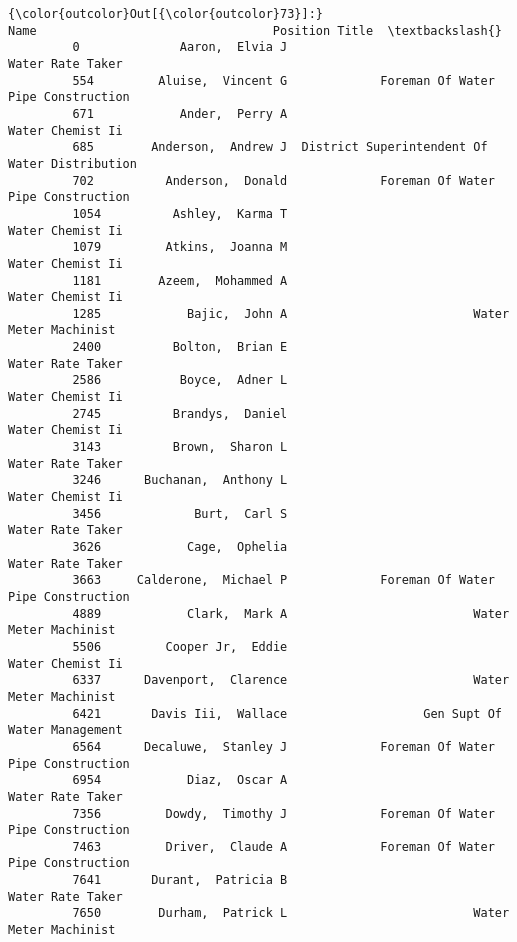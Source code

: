 \documentclass[11pt]{article}
\begin{document}
\begin{Verbatim}[commandchars=\\\{\}]
{\color{outcolor}Out[{\color{outcolor}73}]:}                           Name                                 Position Title  \textbackslash{}
         0              Aaron,  Elvia J                               Water Rate Taker   
         554         Aluise,  Vincent G             Foreman Of Water Pipe Construction   
         671            Ander,  Perry A                               Water Chemist Ii   
         685        Anderson,  Andrew J  District Superintendent Of Water Distribution   
         702          Anderson,  Donald             Foreman Of Water Pipe Construction   
         1054          Ashley,  Karma T                               Water Chemist Ii   
         1079         Atkins,  Joanna M                               Water Chemist Ii   
         1181        Azeem,  Mohammed A                               Water Chemist Ii   
         1285            Bajic,  John A                          Water Meter Machinist   
         2400          Bolton,  Brian E                               Water Rate Taker   
         2586           Boyce,  Adner L                               Water Chemist Ii   
         2745          Brandys,  Daniel                               Water Chemist Ii   
         3143          Brown,  Sharon L                               Water Rate Taker   
         3246      Buchanan,  Anthony L                               Water Chemist Ii   
         3456             Burt,  Carl S                               Water Rate Taker   
         3626            Cage,  Ophelia                               Water Rate Taker   
         3663     Calderone,  Michael P             Foreman Of Water Pipe Construction   
         4889            Clark,  Mark A                          Water Meter Machinist   
         5506         Cooper Jr,  Eddie                               Water Chemist Ii   
         6337      Davenport,  Clarence                          Water Meter Machinist   
         6421       Davis Iii,  Wallace                   Gen Supt Of Water Management   
         6564      Decaluwe,  Stanley J             Foreman Of Water Pipe Construction   
         6954            Diaz,  Oscar A                               Water Rate Taker   
         7356         Dowdy,  Timothy J             Foreman Of Water Pipe Construction   
         7463         Driver,  Claude A             Foreman Of Water Pipe Construction   
         7641       Durant,  Patricia B                               Water Rate Taker   
         7650        Durham,  Patrick L                          Water Meter Machinist   

\end{Verbatim}
\end{document}
